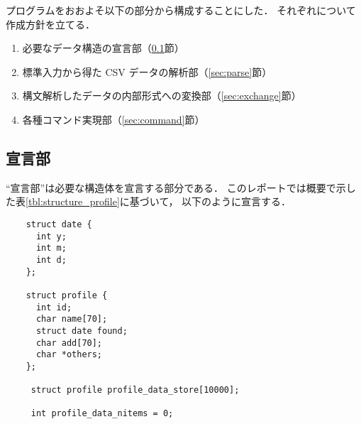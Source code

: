 \documentclass[a4j,11pt]{jarticle}
\begin{document}

プログラムをおおよそ以下の部分から構成することにした．
それぞれについて作成方針を立てる．

\begin{enumerate}
\setlength{\parskip}{2pt} \setlength{\itemsep}{2pt}
    \item 必要なデータ構造の宣言部（\ref{sec:declare}節）
    \item 標準入力から得た CSV データの解析部（\ref{sec:parse}節）
    \item 構文解析したデータの内部形式への変換部（\ref{sec:exchange}節）
    \item 各種コマンド実現部（\ref{sec:command}節）
\end{enumerate}


\subsection{宣言部} 
\label{sec:declare}

``宣言部''は必要な構造体を宣言する部分である．
このレポートでは概要で示した表\ref{tbl:structure_profile}に基づいて，
以下のように宣言する．

{\fontsize{10pt}{11pt} \selectfont
\begin{verbatim}
    struct date {
      int y;
      int m;
      int d;
    };

    struct profile {
      int id;
      char name[70];
      struct date found;
      char add[70];
      char *others;
    };

     struct profile profile_data_store[10000];

     int profile_data_nitems = 0;

\end{verbatim}
}
\end{document}
